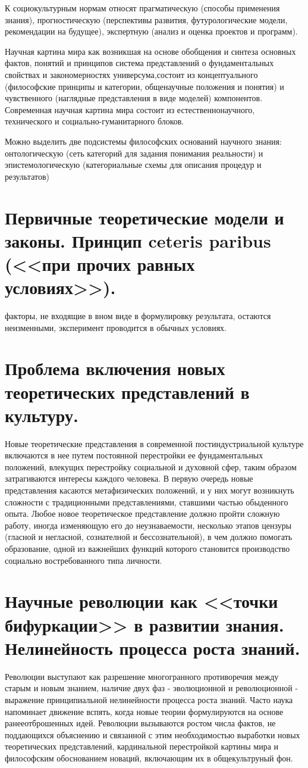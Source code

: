 \documentclass[12pt, specialist, subf, substylefile = spbu.rtx]{disser}
\begin{document}
К социокультурным нормам относят прагматическую (способы применения знания), прогностическую (перспективы развития, футурологические модели, рекомендации на будущее), экспертную (анализ и оценка проектов и программ).

Научная картина мира как возникшая на основе обобщения и синтеза основных фактов, понятий и принципов система представлений о фундаментальных свойствах и закономерностях универсума,состоит из концептуального (философские принципы и категории, общенаучные положения и понятия) и чувственного (наглядные представления в виде моделей) компонентов. Современная научная картина мира состоит из естественнонаучного, технического и социально-гуманитарного блоков.

Можно выделить две подсистемы философских оснований научного знания: онтологическую (сеть категорий для задания понимания реальности) и эпистемологическую (категориальные схемы для описания процедур и результатов)

\section{Первичные теоретические модели и законы. Принцип ceteris paribus (<<при прочих равных условиях>>).}
факторы, не входящие в вном виде в формулировку результата, остаются неизменными, эксперимент проводится в обычных условиях.

\section{Проблема включения новых теоретических представлений в культуру.}
Новые теоретические представления в современной постиндустриальной культуре включаются в нее путем постоянной перестройки ее фундаментальных положений, влекущих перестройку социальной и духовной сфер, таким образом затрагиваются интересы каждого человека. В первую очередь новые представления касаются метафизических положений, и у них могут возникнуть сложности с традиционными представлениями, ставшими частью обыденного опыта. Любое новое теоретическое представление должно пройти сложную работу, иногда изменяющую его до неузнаваемости, несколько этапов цензуры (гласной и негласной, сознателной и бессознательной), в чем должно помогать образование, одной из важнейших функций которого становится производство социально востребованного типа личности.

\section{Научные революции как <<точки бифуркации>> в развитии знания. Нелинейность процесса роста знаний.}
Революции выступают как разрешение многогранного противоречия между старым и новым знанием, наличие двух фаз - эволюционной и революционной - выражение принципиальной нелинейности процесса роста знаний. Часто наука напоминает движение вспять, когда новые теории формулируются на основе ранееотброшенных идей. Революции вызываются ростом числа фактов, не поддающихся объяснению и связанной с этим необходимостью выработки новых теоретических представлений, кардинальной перестройкой картины мира и философским обоснованием новаций, включающим их в общекультруный фон.
\end{document}
